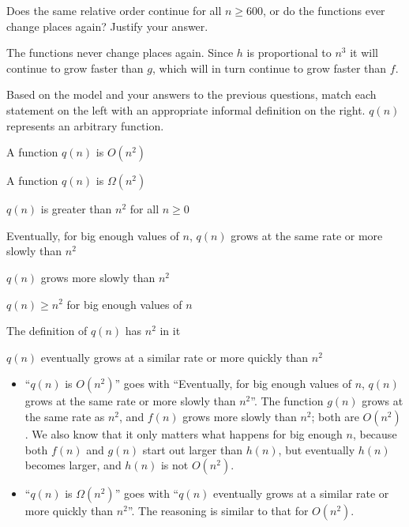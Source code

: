 \documentclass{tufte-handout}
\begin{document}
\begin{questions}
\item Does the same relative order continue for all $n \geq 600$, or do
  the functions ever change places again?  Justify your answer.
  \begin{answer}The functions never change places again.  Since $h$
    is proportional to $n^3$ it will continue to grow faster than
    $g$, which will in turn continue to grow faster than
    $f$.\end{answer}
\item \label{q:synthesize} Based on the model and your answers to the
  previous questions, match each statement on the left with an
  appropriate informal definition on the right. $q(n)$ represents an
  arbitrary function.  \bigskip

  \begin{fullwidth}
  \begin{center}
  \begin{minipage}{0.4\linewidth}
    A function $q(n)$ is $O(n^2)$ \bigskip

    A function $q(n)$ is $\Omega(n^2)$
  \end{minipage}
  \begin{minipage}{0.4\linewidth}
     $q(n)$ is greater than $n^2$ for all $n \geq 0$ \bigskip

     Eventually, for big enough values of $n$, $q(n)$ grows at
      the same rate or more slowly than $n^2$ \bigskip

     $q(n)$ grows more slowly than $n^2$ \bigskip

     $q(n) \geq n^2$ for big enough values of $n$ \bigskip

     The definition of $q(n)$ has $n^2$ in it \bigskip

    $q(n)$ eventually grows at a similar rate or more quickly
      than $n^2$
  \end{minipage}
  \end{center}
  \end{fullwidth}

  \begin{answer}
    \begin{itemize}
    \item ``$q(n)$ is $O(n^2)$'' goes with ``Eventually, for big enough
      values of $n$, $q(n)$ grows at the same rate or more slowly than
      $n^2$''.  The function $g(n)$ grows at the same rate as $n^2$,
      and $f(n)$ grows more slowly than $n^2$; both are $O(n^2)$.  We
      also know that it only matters what happens for big enough $n$,
      because both $f(n)$ and $g(n)$ start out larger than $h(n)$, but
      eventually $h(n)$ becomes larger, and $h(n)$ is not $O(n^2)$.
    \item ``$q(n)$ is $\Omega(n^2)$'' goes with ``$q(n)$ eventually
      grows at a similar rate or more quickly than $n^2$''.  The
      reasoning is similar to that for $O(n^2)$.
    \end{itemize}
  \end{answer}


\end{questions}
\end{document}
